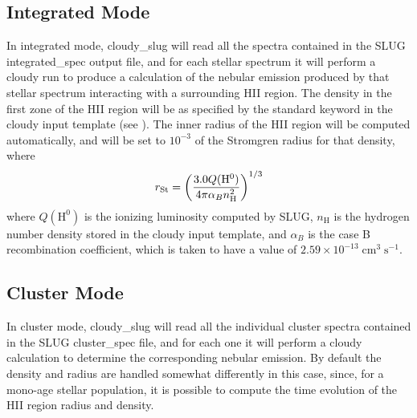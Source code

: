 \documentclass[letterpaper,10pt,english]{sphinxmanual}
\begin{document}
\subsection{Integrated Mode}
\label{cloudy:sssec-cloudy-integrated-mode}\label{cloudy:integrated-mode}
In integrated mode, cloudy\_slug will read all the spectra contained in
the SLUG integrated\_spec output file, and for each stellar spectrum it
will perform a cloudy run to produce a calculation of the nebular
emission produced by that stellar spectrum interacting with a
surrounding HII region. The density in the first zone of the HII
region will be as specified by the standard  keyword in the
cloudy input template (see {\hyperref[cloudy:ssec-cloudy-template]{\emph{}}}). The inner
radius of the HII region will be computed automatically, and will be
set to \(10^{-3}\) of the Stromgren radius for that density, where
\begin{gather}
\begin{split}r_{\mathrm{St}} = \left(\frac{3.0 Q(\mathrm{H}^0)}{4\pi
\alpha_B n_{\mathrm{H}}^2}\right)^{1/3}\end{split}\notag
\end{gather}
where \(Q(\mathrm{H}^0)\) is the ionizing luminosity computed by
SLUG, \(n_{\mathrm{H}}\) is the hydrogen number density stored in
the cloudy input template, and \(\alpha_B\) is the case B
recombination coefficient, which is taken to have a value of
\(2.59\times 10^{-13}\;\mathrm{cm}^3\;\mathrm{s}^{-1}\).


\subsection{Cluster Mode}
\label{cloudy:cluster-mode}\label{cloudy:sssec-cloudy-cluster-mode}
In cluster mode, cloudy\_slug will read all the individual cluster
spectra contained in the SLUG cluster\_spec file, and for each one it
will perform a cloudy calculation to determine the corresponding
nebular emission. By default the density and radius are handled somewhat
differently in this case, since, for a mono-age stellar population, it
is possible to compute the time evolution of the HII region radius and
density.
\end{document}
